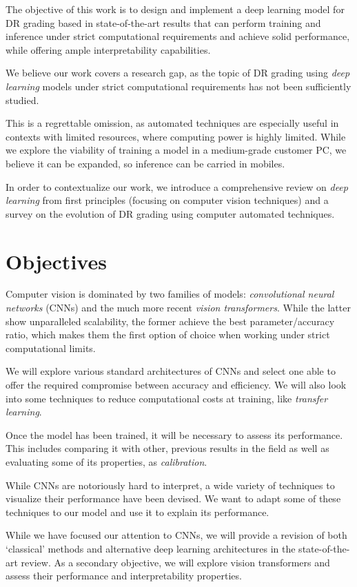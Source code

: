 The objective of this work is to design and implement a deep learning model for DR grading based in state-of-the-art results that can perform training and inference under strict computational requirements and achieve solid performance, while offering ample interpretability capabilities.

We believe our work covers a research gap, as the topic of DR grading using \textit{deep learning} models under strict computational requirements has not been sufficiently studied. 

This is a regrettable omission, as automated techniques are especially useful in contexts with limited resources, where computing power is highly limited. While we explore the viability of training a model in a medium-grade customer PC, we believe it can be expanded, so inference can be carried in mobiles.

In order to contextualize our work, we introduce a comprehensive review on \textit{deep learning} from first principles (focusing on computer vision techniques) and a survey on the evolution of DR grading using computer automated techniques.

\section{Objectives}
Computer vision is dominated by two families of models: \textit{convolutional neural networks} (CNNs) and the much more recent \textit{vision transformers}. While the latter show unparalleled scalability, the former achieve the best parameter/accuracy ratio, which makes them the first option of choice when working under strict computational limits. 

We will explore various standard architectures of CNNs and select one able to offer the required compromise between accuracy and efficiency. We will also look into some techniques to reduce computational costs at training, like \textit{transfer learning}. 

Once the model has been trained, it will be necessary to assess its performance. This includes comparing it with other, previous results in the field as well as evaluating some of its properties, as \textit{calibration}.

While CNNs are notoriously hard to interpret, a wide variety of techniques to visualize their performance have been devised. We want to adapt some of these techniques to our model and use it to explain its performance.

While we have focused our attention to CNNs, we will provide a revision of both `classical' methods and alternative deep learning architectures in the state-of-the-art review. As a secondary objective, we will explore vision transformers and assess their performance and interpretability properties. 

